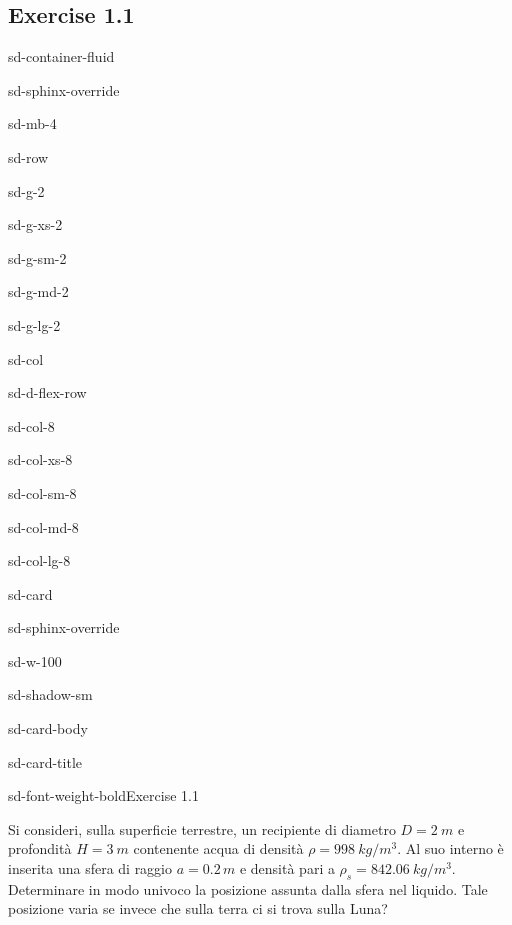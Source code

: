 \documentclass[letterpaper,10pt,italian]{jupyterBook}
\begin{document}
\subsection{Exercise 1.1 }
\label{\detokenize{polimi/fluidmechanics-ita/template/capitoli/01_statica/0201in:exercise-1-1-archimede-s-law-and-buoyancy}}\label{\detokenize{polimi/fluidmechanics-ita/template/capitoli/01_statica/0201in:fluid-mechanics-statics-ex-01}}\label{\detokenize{polimi/fluidmechanics-ita/template/capitoli/01_statica/0201in::doc}}
\begin{sphinxuseclass}{sd-container-fluid}
\begin{sphinxuseclass}{sd-sphinx-override}
\begin{sphinxuseclass}{sd-mb-4}
\begin{sphinxuseclass}{sd-row}
\begin{sphinxuseclass}{sd-g-2}
\begin{sphinxuseclass}{sd-g-xs-2}
\begin{sphinxuseclass}{sd-g-sm-2}
\begin{sphinxuseclass}{sd-g-md-2}
\begin{sphinxuseclass}{sd-g-lg-2}
\begin{sphinxuseclass}{sd-col}
\begin{sphinxuseclass}{sd-d-flex-row}
\begin{sphinxuseclass}{sd-col-8}
\begin{sphinxuseclass}{sd-col-xs-8}
\begin{sphinxuseclass}{sd-col-sm-8}
\begin{sphinxuseclass}{sd-col-md-8}
\begin{sphinxuseclass}{sd-col-lg-8}
\begin{sphinxuseclass}{sd-card}
\begin{sphinxuseclass}{sd-sphinx-override}
\begin{sphinxuseclass}{sd-w-100}
\begin{sphinxuseclass}{sd-shadow-sm}
\begin{sphinxuseclass}{sd-card-body}
\begin{sphinxuseclass}{sd-card-title}
\begin{sphinxuseclass}{sd-font-weight-bold}Exercise 1.1
\end{sphinxuseclass}
\end{sphinxuseclass}
\sphinxAtStartPar
Si consideri, sulla superficie terrestre, un recipiente di diametro \(D=2 \ m\) e profondità \(H=3\  m\) contenente acqua di densità \(\rho = 998\ kg / m^3\). Al suo interno è inserita una sfera di raggio \(a=0.2\, m\) e densità pari a \(\rho_s=842.06\ kg / m^3\).
Determinare in modo univoco la posizione assunta dalla sfera nel liquido. Tale posizione varia se invece che sulla terra ci si trova sulla Luna?


\end{sphinxuseclass}
\end{sphinxuseclass}
\end{sphinxuseclass}
\end{sphinxuseclass}
\end{sphinxuseclass}
\end{sphinxuseclass}
\end{sphinxuseclass}
\end{sphinxuseclass}
\end{sphinxuseclass}
\end{sphinxuseclass}
\end{sphinxuseclass}
\end{sphinxuseclass}
\end{sphinxuseclass}
\end{sphinxuseclass}
\end{sphinxuseclass}
\end{sphinxuseclass}
\end{sphinxuseclass}
\end{sphinxuseclass}
\end{sphinxuseclass}
\end{sphinxuseclass}
\end{sphinxuseclass}
\end{document}
